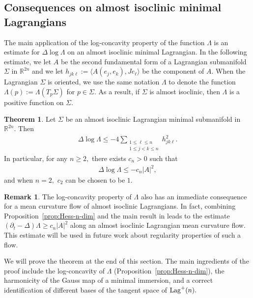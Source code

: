 \documentclass[11pt]{amsart}
\numberwithin{equation}{section}
\theoremstyle{definition}
\newtheorem{thm}[equation]{Theorem} %
\theoremstyle{definition}
\newtheorem{remark}[equation]{Remark}
\newcommand{\pair}[1]{\langle #1\rangle}
\newcommand{\pr}[1]{\left(#1\right)}
\newcommand{\bb}[1]{\mathbb{#1}} \newcommand{\td}[1]{\widetilde{#1}}
\newcommand{\D}{\Delta}
\newcommand{\bd}{\partial}
\begin{document}
\subsection{Consequences on almost isoclinic minimal Lagrangians}
\label{sec:Gauss-map}


The main application of the log-concavity property of the function $\Lambda$ is an estimate for $\D\log\Lambda$ on an almost isoclinic minimal Lagrangian.
In the following estimate, we let $A$ be the second fundamental form of a Lagrangian submanifold $\Sigma$ in $\bb R^{2n}$ and we let $h_{jk\ell}:=\pair{A(e_j,e_k),Je_{\ell}}$ be the component of $A.$
When the Lagrangian $\Sigma$ is oriented, we use the same notation $\Lambda$ to denote the function $\Lambda(p):=\Lambda\pr{T_p\Sigma}$ for $p\in\Sigma.$
As a result, if $\Sigma$ is almost isoclinic, then $\Lambda$ is a positive function on $\Sigma.$

\begin{thm}
	\label{thm:Lambda-elliptic-equation}
	Let $\Sigma$ be an almost isoclinic Lagrangian minimal submanifold in $\bb R^{2n}.$
	Then
	\begin{align*}
	\D\log\Lambda
	\le - 4
	\sum_{\substack{1\le \ell\le n\\ 1\le j<k\le n}} h_{jk\ell}^2.
	\end{align*}
	In particular, for any $n\ge 2,$ there exists $c_n>0$ such that
	\begin{align*}
	\D\log\Lambda \le -c_n|A|^2,
	\end{align*}
	and when $n=2,$ $c_2$ can be chosen to be $1.$
\end{thm}

\begin{remark}
    The log-concavity property of $\Lambda$ also has an immediate consequence for a mean curvature flow of almost isoclinic Lagrangians.
    In fact, combining Proposition~\ref{prop:Hess-n-dim} and the main result in \cite{W03-MCF} leads to the estimate $(\bd_t-\D)\Lambda\ge c_n|A|^2$ along an almost isoclinic Lagrangian mean curvature flow.
    This estimate will be used in future work about regularity properties of such a flow.
\end{remark}

We will prove the theorem at the end of this section.
The main ingredients of the proof include the log-concavity of $\Lambda$ (Proposition~\ref{prop:Hess-n-dim}), the harmonicity of the Gauss map of a minimal immersion, and a correct identification of different bases of the tangent space of ${\rm Lag}^+(n).$
\end{document}
